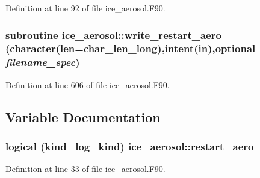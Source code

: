 Definition at line 92 of file ice\_\-aerosol.F90.\hypertarget{namespaceice__aerosol_a1e014a016b35aba5d5f31a829ffa909f}{
\subsubsection[{write\_\-restart\_\-aero}]{\setlength{\rightskip}{0pt plus 5cm}subroutine ice\_\-aerosol::write\_\-restart\_\-aero (character(len=char\_\-len\_\-long),intent(in),optional {\em filename\_\-spec})}}
\label{namespaceice__aerosol_a1e014a016b35aba5d5f31a829ffa909f}


Definition at line 606 of file ice\_\-aerosol.F90.

\subsection{Variable Documentation}
\hypertarget{namespaceice__aerosol_a3ceb80d852249f318373d31d28ce9007}{
\subsubsection[{restart\_\-aero}]{\setlength{\rightskip}{0pt plus 5cm}logical (kind=log\_\-kind) {\bf ice\_\-aerosol::restart\_\-aero}}}
\label{namespaceice__aerosol_a3ceb80d852249f318373d31d28ce9007}


Definition at line 33 of file ice\_\-aerosol.F90.